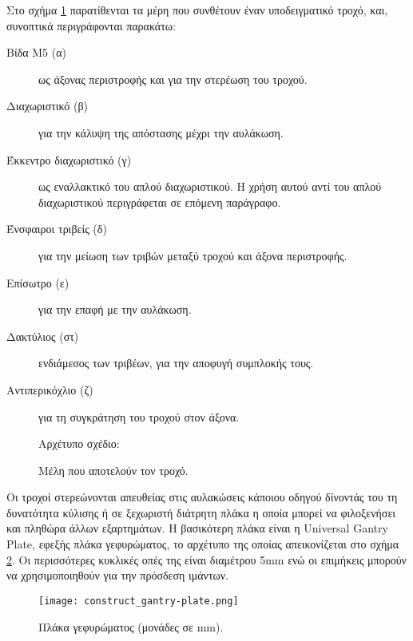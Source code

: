 Στο σχήμα \ref{fig:construct:wheel_exploded} παρατίθενται τα μέρη που συνθέτουν
έναν υποδειγματικό τροχό, και, συνοπτικά περιγράφονται παρακάτω:
\begin{flushleft}
\begin{description}
    \item[Βίδα M5 (α)] ως άξονας περιστροφής και για την στερέωση του τροχού.
    \item[Διαχωριστικό (β)] για την κάλυψη της απόστασης μέχρι την αυλάκωση.
    \item[Έκκεντρο διαχωριστικό (γ)] ως εναλλακτικό του απλού διαχωριστικού. Η
    χρήση αυτού αντί του απλού διαχωριστικού περιγράφεται σε επόμενη παράγραφο.
    \item[Ένσφαιροι τριβείς (δ)] για την μείωση των τριβών μεταξύ τροχού και
    άξονα περιστροφής.
    \item[Επίσωτρο (ε)] για την επαφή με την αυλάκωση.
    \item[Δακτύλιος (στ)] ενδιάμεσος των τριβέων, για την αποφυγή συμπλοκής
    τους.
    \item[Αντιπερικόχλιο (ζ)] για τη συγκράτηση του τροχού στον άξονα.
\end{description}
\end{flushleft}

\begin{figure}
    \caption{Μέλη που αποτελούν τον τροχό.\label{fig:construct:wheel_exploded}}
    \begin{center}%
    \def\svgwidth{0.8\textwidth}
    
    \end{center}
    Αρχέτυπο σχέδιο:
\end{figure}

Οι τροχοί στερεώνονται απευθείας στις αυλακώσεις κάποιου οδηγού δίνοντάς του τη
δυνατότητα κύλισης ή σε ξεχωριστή διάτρητη πλάκα η οποία μπορεί να φιλοξενήσει
και πληθώρα άλλων εξαρτημάτων. Η βασικότερη πλάκα είναι η Universal Gantry
Plate, εφεξής πλάκα γεφυρώματος, το αρχέτυπο της οποίας απεικονίζεται στο σχήμα
\ref{fig:construct:gantry-plate}. Οι περισσότερες κυκλικές οπές της είναι
διαμέτρου 5mm ενώ οι επιμήκεις μπορούν να χρησιμοποιηθούν για την πρόσδεση
ιμάντων.

\begin{figure}
    \caption[Πλάκα γεφυρώματος]{Πλάκα γεφυρώματος (μονάδες σε mm).
    \label{fig:construct:gantry-plate}}
    \begin{center}%
    \texttt{[image: construct\_gantry-plate.png]}%
    \end{center}

\end{figure}

